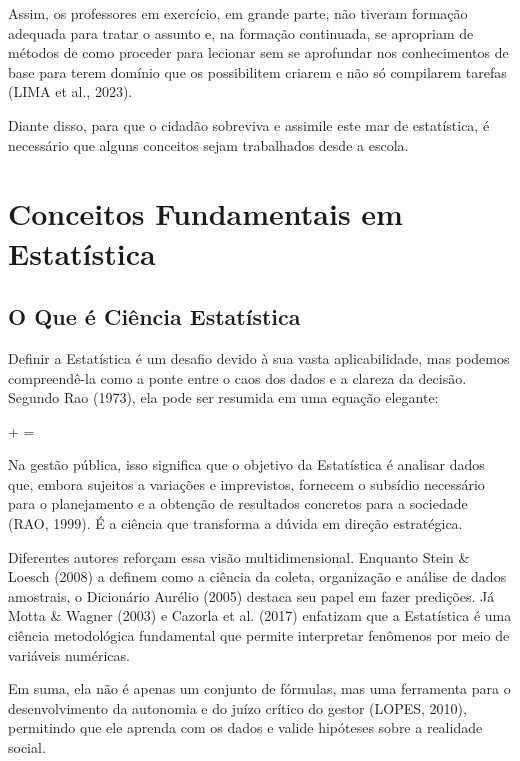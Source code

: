 Assim, os professores em exercício, em grande parte, não tiveram formação adequada para tratar o assunto e, na formação continuada, se apropriam de métodos de como proceder para lecionar sem se aprofundar nos conhecimentos de base para terem domínio que os possibilitem criarem e não só compilarem tarefas (LIMA et al., 2023). \vskip0.3cm

Diante disso, para que o cidadão sobreviva e assimile este mar de estatística, é necessário que alguns conceitos sejam trabalhados desde a escola.

\section{Conceitos Fundamentais em Estatística}
\subsection{O Que é Ciência Estatística}

Definir a Estatística é um desafio devido à sua vasta aplicabilidade, mas podemos compreendê-la como a ponte entre o caos dos dados e a clareza da decisão. Segundo Rao (1973), ela pode ser resumida em uma equação elegante: 

\begin{center}
 +   =  
\end{center}

Na gestão pública, isso significa que o objetivo da Estatística é analisar dados que, embora sujeitos a variações e imprevistos, fornecem o subsídio necessário para o planejamento e a obtenção de resultados concretos para a sociedade (RAO, 1999). É a ciência que transforma a dúvida em direção estratégica. \vskip0.3cm

Diferentes autores reforçam essa visão multidimensional. Enquanto Stein \& Loesch (2008) a definem como a ciência da coleta, organização e análise de dados amostrais, o Dicionário Aurélio (2005) destaca seu papel em fazer predições. Já Motta \& Wagner (2003) e Cazorla et al. (2017) enfatizam que a Estatística é uma ciência metodológica fundamental que permite interpretar fenômenos por meio de variáveis numéricas. \vskip0.3cm

Em suma, ela não é apenas um conjunto de fórmulas, mas uma ferramenta para o desenvolvimento da autonomia e do juízo crítico do gestor (LOPES, 2010), permitindo que ele aprenda com os dados e valide hipóteses sobre a realidade social. \vskip0.3cm

